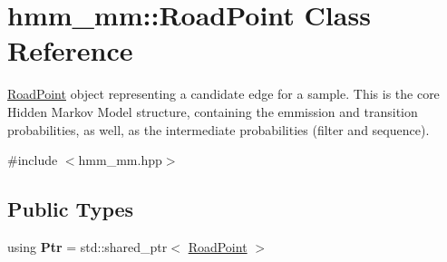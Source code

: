 \hypertarget{classhmm__mm_1_1RoadPoint}{}\section{hmm\+\_\+mm\+:\+:Road\+Point Class Reference}
\label{classhmm__mm_1_1RoadPoint}


\hyperlink{classhmm__mm_1_1RoadPoint}{Road\+Point} object representing a candidate edge for a sample. This is the core Hidden Markov Model structure, containing the emmission and transition probabilities, as well, as the intermediate probabilities (filter and sequence).  




{\ttfamily \#include $<$hmm\+\_\+mm.\+hpp$>$}

\subsection*{Public Types}
\begin{DoxyCompactItemize}
\item 
using {\bfseries Ptr} = std\+::shared\+\_\+ptr$<$ \hyperlink{classhmm__mm_1_1RoadPoint}{Road\+Point} $>$\hypertarget{classhmm__mm_1_1RoadPoint_a50405ae3f502d3a034f4ee16a2ef5e7f}{}\label{classhmm__mm_1_1RoadPoint_a50405ae3f502d3a034f4ee16a2ef5e7f}

\end{DoxyCompactItemize}
